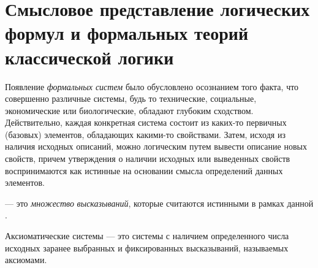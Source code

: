 
\section{Смысловое представление логических формул и формальных теорий классической логики}
\label{sec_class_logic}
Появление \textit{формальных систем} было обусловлено осознанием того факта, что совершенно различные системы, будь то технические, социальные, экономические или биологические, обладают глубоким сходством. Действительно, каждая конкретная система состоит из каких-то первичных (базовых) элементов, обладающих какими-то свойствами. Затем, исходя из наличия исходных описаний, можно логическим путем вывести описание новых свойств, причем утверждения о наличии исходных или выведенных свойств воспринимаются как истинные на основании смысла определений данных элементов.

 --- это \textit{множество} \textit{высказываний}, которые считаются истинными в рамках данной .

Аксиоматические системы --- это системы с наличием определенного числа исходных заранее выбранных и фиксированных высказываний, называемых аксиомами.

